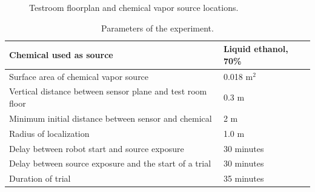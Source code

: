 \documentclass[submit, 12pt]{aiaa-pretty-modified}
\newcommand{\Tablewidthtwo}[0]{3in}
\begin{document}
\begin{figure}
\begin{center}
\caption{Testroom floorplan and chemical vapor source locations.}
\label{fig:testroom}
\end{center}
\end{figure}

\begin{table}
\caption{Parameters of the experiment.}
\begin{center}
\begin{tabular}{|p{\Tablewidthtwo}|p{\Tablewidthtwo}|}
\hline
Chemical used as source & Liquid ethanol, 70\% \\ \hline
Surface area of chemical vapor source & 0.018 $\text{m}^2$\\ \hline
Vertical distance between sensor plane and
test room floor & 0.3 $\text{m}$ \\ \hline
Minimum initial distance between sensor and chemical & 2 $\text{m}$ \\ \hline
Radius of localization & 1.0 $\text{m}$ \\ \hline
Delay between robot start and source exposure & 30 minutes \\ \hline
Delay between source exposure and the start of a trial & 30 minutes \\ \hline
Duration of trial & 35 minutes \\ \hline
\end{tabular}
\end{center}
\label{tab:parameters}
\end{table}
\end{document}
